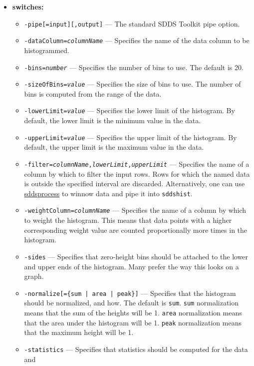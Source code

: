 \begin{itemize}
\item {\bf switches:}
    \begin{itemize}
    \item \verb|-pipe[=input][,output]| --- The standard SDDS Toolkit pipe option.
    \item {\tt -dataColumn={\em columnName}} --- Specifies the name of the data column to be histogrammed.
    \item {\tt -bins={\em number}} --- Specifies the number of bins to use.  The default is 20.
    \item {\tt -sizeOfBins={\em value}} --- Specifies the size of bins to use.  The number of bins is
        computed from the range of the data.
    \item {\tt -lowerLimit={\em value}} --- Specifies the lower limit of the histogram.  By default,
        the lower limit is the minimum value in the data.
    \item {\tt -upperLimit={\em value}} --- Specifies the upper limit of the histogram.  By default,
        the upper limit is the maximum value in the data.
    \item {\tt -filter={\em columnName},{\em lowerLimit},{\em upperLimit}} --- Specifies the name of a column by which to filter the input rows.
        Rows for which the named data is outside the specified interval are discarded.
        Alternatively, one can use \hyperref{sddsprocess}{sddsprocess (see }{)}{sddsprocess}
        to winnow data and pipe it into {\tt sddshist}.
    \item {\tt -weightColumn={\em columnName}} --- Specifies the name of a column by which to weight the
        histogram.  This means that data points with a higher corresponding weight value
        are counted proportionally more times in the histogram.  
    \item {\tt -sides} --- Specifies that zero-height bins should be attached to the lower
        and upper ends of the histogram.  Many prefer the way this looks on a graph.
    \item {\tt -normalize[=\{sum | area | peak\}]} --- Specifies that the histogram should be normalized, and how.
        The default is {\tt sum}.  {\tt sum} normalization means that the sum of the heights will be 1.
        {\tt area} normalization means that the area under the histogram will be 1.
        {\tt peak} normalization means that the maximum height will be 1.
    \item {\tt -statistics} --- Specifies that statistics should be computed for the data and

\end{itemize}
\end{itemize}
